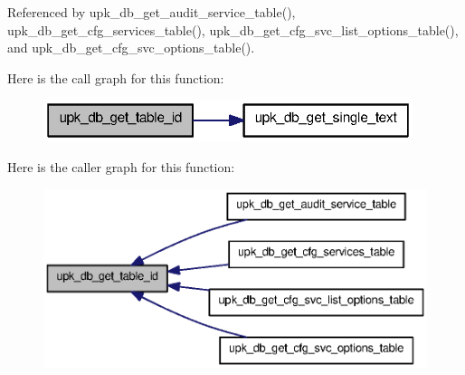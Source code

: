 Referenced by upk\_\-db\_\-get\_\-audit\_\-service\_\-table(), upk\_\-db\_\-get\_\-cfg\_\-services\_\-table(), upk\_\-db\_\-get\_\-cfg\_\-svc\_\-list\_\-options\_\-table(), and upk\_\-db\_\-get\_\-cfg\_\-svc\_\-options\_\-table().



Here is the call graph for this function:
\nopagebreak
\begin{figure}[H]
\begin{center}
\leavevmode
\includegraphics[width=306pt]{controller_2tp_8c_a0550e7a1649badcbfcc64b56848504e6_cgraph}
\end{center}
\end{figure}




Here is the caller graph for this function:
\nopagebreak
\begin{figure}[H]
\begin{center}
\leavevmode
\includegraphics[width=374pt]{controller_2tp_8c_a0550e7a1649badcbfcc64b56848504e6_icgraph}
\end{center}
\end{figure}


